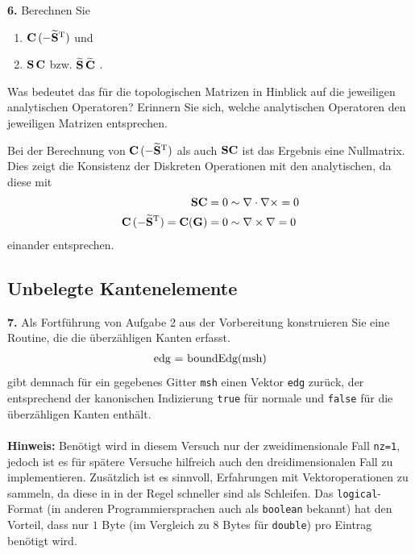 \documentclass[Protokollheft.tex]{subfiles}
\begin{document}
        \begin{framed}
	\noindent \textbf{6.} Berechnen Sie
                    \begin{enumerate}
                        \item $\mathbf{C}\, (-\widetilde{\mathbf{S}}^{\text{T}})$ und
                        \item $\mathbf{S}\, \mathbf{C}$ bzw. $\widetilde{\mathbf{S}}\, \widetilde{\mathbf{C}}$ \; .
                    \end{enumerate}
                    Was bedeutet das für die topologischen Matrizen in Hinblick
                    auf die jeweiligen analytischen Operatoren? Erinnern Sie sich, welche analytischen Operatoren den jeweiligen Matrizen entsprechen.\label{exer:CG_SC}
\end{framed}
\noindent
Bei der Berechnung von $\mathbf{C}\, (-\widetilde{\mathbf{S}}^{\text{T}})$ als auch $\mathbf{S}\mathbf{C}$ ist das Ergebnis eine Nullmatrix. Dies zeigt die Konsistenz der Diskreten Operationen mit den analytischen, da diese mit
\begin{align*}
	\mathbf{S}\mathbf{C} = 0  &\sim  \nabla \cdot \nabla \times = 0\\
	\mathbf{C}\, (-\widetilde{\mathbf{S}}^{\text{T}})=\mathbf{C}(\mathbf{G}) = 0 &\sim  \nabla \times \nabla	= 0
\end{align*}
einander entsprechen. 
{\subsection{Unbelegte Kantenelemente}}

        \begin{framed}
	\noindent \textbf{7.} Als Fortführung von Aufgabe 2 aus der Vorbereitung
                    konstruieren Sie eine Routine, die die überzähligen Kanten erfasst.
                    \begin{align}
                        \lstinline{edg = boundEdg(msh)}
                    \end{align}
                    gibt demnach für ein gegebenes Gitter \lstinline{msh} einen Vektor \lstinline{edg} zurück, der
                    entsprechend der kanonischen Indizierung \lstinline{true} für normale und \lstinline{false}
                    für die überzähligen Kanten enthält.\\
                    \ \\
                    {\textbf{Hinweis:}} Benötigt wird in diesem Versuch nur der zweidimensionale Fall \lstinline{nz=1}, jedoch ist es für spätere Versuche hilfreich auch den dreidimensionalen Fall zu implementieren. Zusätzlich ist es sinnvoll, Erfahrungen mit Vektoroperationen zu sammeln, da diese in \matlab in der Regel schneller sind als Schleifen. Das \lstinline{logical}-Format (in anderen Programmiersprachen auch als \lstinline{boolean} bekannt) hat den Vorteil, dass nur $1$ Byte (im Vergleich zu $8$ Bytes für \lstinline{double}) pro Eintrag benötigt wird.\label{exer:boundEdg}
\end{framed}
\end{document}
